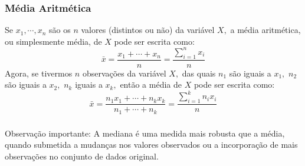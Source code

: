 \documentclass[14pt,aspectratio=1610]{beamer}
\newcommand{\bx}{\ensuremath{\bar{x}}}
\begin{document}
\begin{frame}{}
\frametitle{Média Aritmética}
\begin{block}{}
\justifying
Se $x_{1},\cdots,x_{n}$ são os $n$ valores (distintos ou não) da variável $X,$ a média aritmética, ou simplesmente média, de $X$ pode ser escrita como:
\begin{equation}
\bx=\dfrac{x_{1}+\cdots+x_{n}}{n}=\dfrac{\displaystyle \sum_{i=1}^{n}{x_{i}}}{n}
\end{equation}
Agora, se tivermos $n$ observações da variável $X,$ das quais $n_{1}$ são iguais a $x_{1},$ $n_{2}$ são iguais
a $x_{2},$ $n_{k}$ iguais a $x_{k},$ então a média de $X$ pode ser escrita como:
\begin{equation}
\bx=\dfrac{n_{1}x_{1}+\cdots+n_{k}x_{k}}{n_{1}+\cdots+n_{k}}=\dfrac{\displaystyle \sum_{i=1}^{k}n_{i}x_{i}}{n}
\end{equation}
\end{block}
\end{frame}



\begin{frame}{}
\frametitle{}
\begin{block}{Observação importante:}
\justifying
A mediana é uma medida mais robusta que a média, quando submetida a mudanças nos valores observados ou a incorporação de mais observações no conjunto de dados original.
\end{block}
\end{frame}
\end{document}
